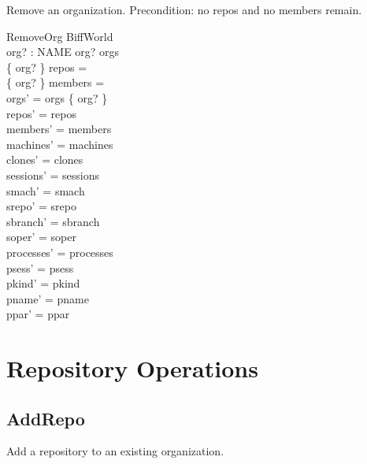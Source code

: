 \documentclass[a4paper,10pt,fleqn]{article}
\begin{document}
Remove an organization.  Precondition: no repos and no members remain.

\begin{schema}{RemoveOrg}
  \Delta BiffWorld \\
  org? : NAME
  \where
  org? \in orgs \\
  \{ org? \} \dres repos = \emptyset \\
  \{ org? \} \dres members = \emptyset \\
  orgs' = orgs \setminus \{ org? \} \\
  repos' = repos \\
  members' = members \\
  machines' = machines \\
  clones' = clones \\
  sessions' = sessions \\
  smach' = smach \\
  srepo' = srepo \\
  sbranch' = sbranch \\
  soper' = soper \\
  processes' = processes \\
  psess' = psess \\
  pkind' = pkind \\
  pname' = pname \\
  ppar' = ppar
\end{schema}

\section{Repository Operations}

\subsection{AddRepo}

Add a repository to an existing organization.
\end{document}
